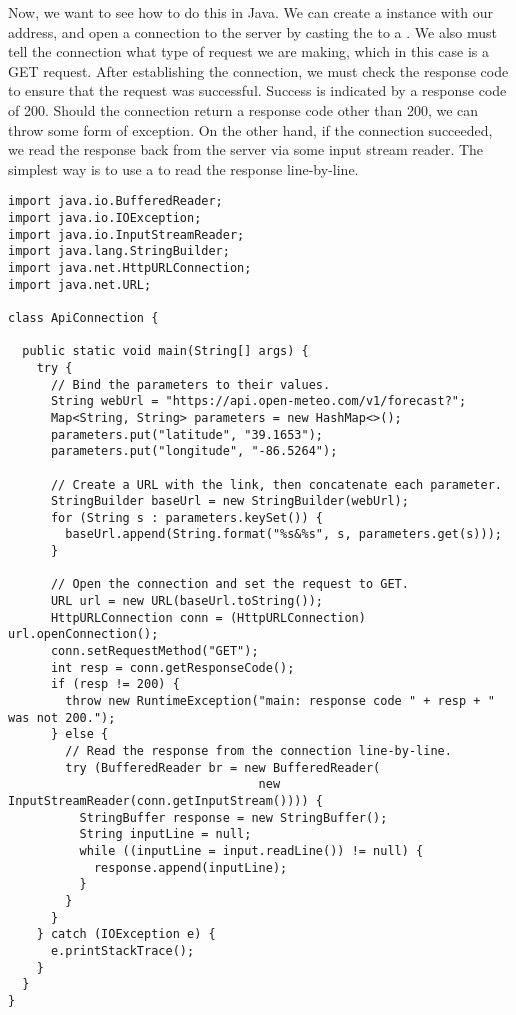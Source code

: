 Now, we want to see how to do this in Java. We can create a  instance with our address, and open a connection to the server by casting the  to a . We also must tell the connection what type of request we are making, which in this case is a GET request. After establishing the connection, we must check the response code to ensure that the request was successful. Success is indicated by a response code of 200. Should the connection return a response code other than 200, we can throw some form of exception. On the other hand, if the connection succeeded, we read the response back from the server via some input stream reader. The simplest way is to use a  to read the response line-by-line.

\begin{cl}[]{}
\begin{lstlisting}[language=MyJava]
import java.io.BufferedReader;
import java.io.IOException;
import java.io.InputStreamReader;
import java.lang.StringBuilder;
import java.net.HttpURLConnection;
import java.net.URL;

class ApiConnection {

  public static void main(String[] args) {
    try {
      // Bind the parameters to their values.
      String webUrl = "https://api.open-meteo.com/v1/forecast?";
      Map<String, String> parameters = new HashMap<>();
      parameters.put("latitude", "39.1653");
      parameters.put("longitude", "-86.5264");

      // Create a URL with the link, then concatenate each parameter.
      StringBuilder baseUrl = new StringBuilder(webUrl);
      for (String s : parameters.keySet()) { 
        baseUrl.append(String.format("%s&%s", s, parameters.get(s))); 
      }
    
      // Open the connection and set the request to GET.
      URL url = new URL(baseUrl.toString());
      HttpURLConnection conn = (HttpURLConnection) url.openConnection();
      conn.setRequestMethod("GET");
      int resp = conn.getResponseCode();
      if (resp != 200) {
        throw new RuntimeException("main: response code " + resp + " was not 200.");
      } else {
        // Read the response from the connection line-by-line.
        try (BufferedReader br = new BufferedReader(
                                   new InputStreamReader(conn.getInputStream()))) {
          StringBuffer response = new StringBuffer();
          String inputLine = null;
          while ((inputLine = input.readLine()) != null) { 
            response.append(inputLine); 
          }
        }
      }
    } catch (IOException e) {
      e.printStackTrace();
    }
  }
}
\end{lstlisting}
\end{cl}

